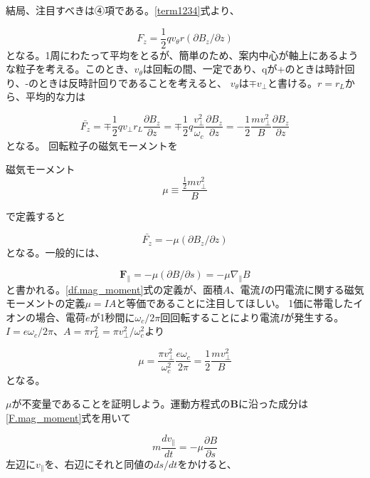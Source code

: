 \documentclass{ltjsarticle}
\numberwithin{equation}{section} %
\begin{document}
結局、注目すべきは➃項である。\eqref{term1234}式より、

\begin{equation}
  F_z = \frac{1}{2}qv_\theta r(\partial B_z/\partial z)
\end{equation}
となる。1周にわたって平均をとるが、簡単のため、案内中心が軸上にあるような粒子を考える。このとき、$v_\theta$は回転の間、一定であり、qが+のときは時計回り、-のときは反時計回りであることを考えると、
$v_\theta$は$\mp v_\perp$と書ける。$r=r_L$から、平均的な力は

\begin{equation}
  \bar{F_z} = \mp \frac{1}{2}qv_\perp r_L\frac{\partial B_z}{\partial z} = \mp \frac{1}{2}q\frac{v_\perp ^2}{\omega_c}\frac{\partial B_z}{\partial z} = -\frac{1}{2}\frac{mv_\perp ^2}{B}\frac{\partial B_z}{\partial z}
\end{equation}
となる。
回転粒子の磁気モーメントを
\begin{eqbox}{磁気モーメント}
\begin{equation}
 \mu \equiv \dfrac{\frac{1}{2}mv_\perp ^2 }{B}  \label{df.mag_moment}
\end{equation}
\end{eqbox}
で定義すると

\begin{equation}
  \bar{F_z} = -\mu (\partial B_z / \partial z)
\end{equation}
となる。一般的には、

\begin{equation}
  \bm{F}_\parallel = -\mu (\partial B /\partial s) = -\mu \nabla_\parallel B \label{F.mag_moment}
\end{equation}
と書かれる。\eqref{df.mag_moment}式の定義が、面積$A$、電流$I$の円電流に関する磁気モーメントの定義$\mu= IA$と等価であることに注目してほしい。
1価に帯電したイオンの場合、電荷$e$が1秒間に$\omega_c/2\pi$回回転することにより電流$I$が発生する。$I=e\omega_c/2\pi$、$A=\pi r_L ^2 = \pi v_\perp ^2/\omega_c ^2$より

\[
 \mu = \frac{\pi v_\perp ^2}{\omega_c ^2}\frac{e\omega_c}{2\pi} = \frac{1}{2}\frac{mv_\perp ^2}{B}
\]
となる。

$\mu$が不変量であることを証明しよう。運動方程式の$\bm{B}$に沿った成分は\eqref{F.mag_moment}式を用いて

\begin{equation}
  m\frac{dv_\parallel}{dt} = -\mu \frac{\partial B}{\partial s}
\end{equation}
左辺に$v_\parallel$を、右辺にそれと同値の$ds/dt$をかけると、
\end{document}
